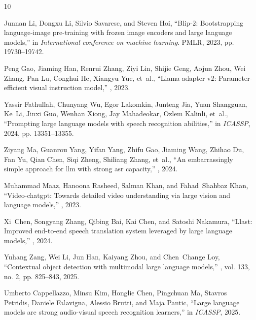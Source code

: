 \documentclass{article}
\begin{document}
\clearpage


\begin{thebibliography}{10}

Junnan Li, Dongxu Li, Silvio Savarese, and Steven Hoi,
\newblock ``Blip-2: Bootstrapping language-image pre-training with frozen image
  encoders and large language models,''
\newblock in {\em International conference on machine learning}. PMLR, 2023,
  pp. 19730--19742.

Peng Gao, Jiaming Han, Renrui Zhang, Ziyi Lin, Shijie Geng, Aojun Zhou, Wei
  Zhang, Pan Lu, Conghui He, Xiangyu Yue, et~al.,
\newblock ``Llama-adapter v2: Parameter-efficient visual instruction model,''
, 2023.

Yassir Fathullah, Chunyang Wu, Egor Lakomkin, Junteng Jia, Yuan Shangguan,
  Ke~Li, Jinxi Guo, Wenhan Xiong, Jay Mahadeokar, Ozlem Kalinli, et~al.,
\newblock ``Prompting large language models with speech recognition
  abilities,''
\newblock in {\em ICASSP}, 2024, pp. 13351--13355.

Ziyang Ma, Guanrou Yang, Yifan Yang, Zhifu Gao, Jiaming Wang, Zhihao Du, Fan
  Yu, Qian Chen, Siqi Zheng, Shiliang Zhang, et~al.,
\newblock ``An embarrassingly simple approach for llm with strong asr
  capacity,''
, 2024.

Muhammad Maaz, Hanoona Rasheed, Salman Khan, and Fahad~Shahbaz Khan,
\newblock ``Video-chatgpt: Towards detailed video understanding via large
  vision and language models,''
, 2023.

Xi~Chen, Songyang Zhang, Qibing Bai, Kai Chen, and Satoshi Nakamura,
\newblock ``Llast: Improved end-to-end speech translation system leveraged by
  large language models,''
, 2024.

Yuhang Zang, Wei Li, Jun Han, Kaiyang Zhou, and Chen~Change Loy,
\newblock ``Contextual object detection with multimodal large language
  models,''
, vol. 133, no. 2, pp.
  825--843, 2025.

Umberto Cappellazzo, Minsu Kim, Honglie Chen, Pingchuan Ma, Stavros Petridis,
  Daniele Falavigna, Alessio Brutti, and Maja Pantic,
\newblock ``Large language models are strong audio-visual speech recognition
  learners,''
\newblock in {\em ICASSP}, 2025.


\end{thebibliography}
\end{document}

